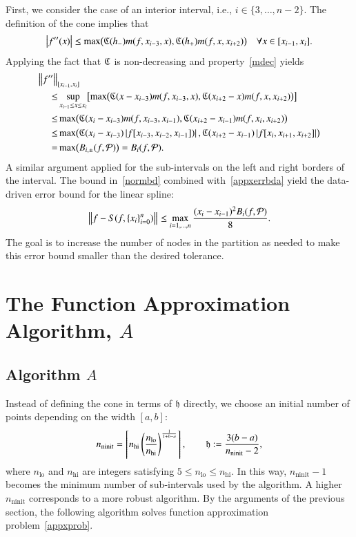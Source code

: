 \documentclass[review]{elsarticle}
\newcommand{\datasites}{\{x_i\}_{i=0}^n}
\theoremstyle{definition}
\DeclareMathOperator{\lo}{lo}
\DeclareMathOperator{\ninit}{ninit}
\begin{document}
First, we consider the case of an interior interval, i.e., $i \in \{3, \ldots, n-2\}$. The definition of the cone implies that
\begin{equation*}
\left \lvert f''(x) \right \rvert \le \max\bigl(\mathfrak{C}(h_-)m(f,x_{i-3},x),\mathfrak{C}(h_+)m(f,x,x_{i+2})\bigr)  \quad  \forall x \in [x_{i-1},x_i].
\end{equation*}
Applying the fact that $\mathfrak{C}$ is non-decreasing and property~\eqref{mdec} yields
\begin{align*}
\nonumber
\MoveEqLeft{\norm[{[x_{i-1},x_i]}]{f''}}\\
\nonumber
 \le  & \sup_{x_{i-1} \le x \le x_i} \bigl[\max\bigl(\fC(x-x_{i-3})m(f,x_{i-3},x),\fC(x_{i+2}-x)m(f,x,x_{i+2})\bigr)\bigr]  \\
\nonumber
 \le  &  \max\bigl(\fC(x_{i}-x_{i-3})m(f,x_{i-3},x_{i-1}),\fC(x_{i+2}-x_{i-1})m(f,x_i,x_{i+2})\bigr) \\
\nonumber  \le & \max\bigl(\fC(x_{i}-x_{i-3})\abs{f[x_{i-3},x_{i-2},x_{i-1}])},\bigr.
 \fC(x_{i+2}-x_{i-1})\abs{f[x_i,x_{i+1},x_{i+2}]}\bigr) \\
 =  & \max\bigl(B_{i,\pm}(f,\cp)\bigr) = B_i(f,\cp).
\end{align*}
A similar argument applied for the sub-intervals on the left and right borders of the interval.
The bound in~\eqref{normbd} combined with~\eqref{appxerrbda} yield the
data-driven error bound for the linear spline:
\begin{equation} \label{appxerrbdb}
\norm{f - S(f,\datasites)} \le
\max_{i=1, \ldots, n} \frac{(x_i - x_{i-1})^2 B_{i}(f,\cp)}{8} .
\end{equation}
The goal is to increase the number of nodes in the partition as needed to make
this error bound smaller than the desired tolerance.

\section{The Function Approximation Algorithm, $A$}\label{sec:fappx}


\subsection{Algorithm $A$} \label{subsec:appxalgo}
Instead of defining the cone in terms of $\mathfrak{h}$ directly, we choose an initial number of points depending on the width $[a,b]$:
\begin{equation}
\label{nodefinition}
n_{\ninit} = \left\lceil n_{\text{hi}}
\left(\frac{n_{\lo}}{n_{\text{hi}}}\right)^{\frac{1}{1+b-a}}\right\rceil, \qquad \fh := \frac{3(b-a)}{n_{\ninit}-2},
\end{equation}
where $n_{\lo}$ and $n_{\text{hi}}$ are integers satisfying $5 \le n_{\lo} \le n_{\text{hi}}$.  In this way, $n_{\ninit} -1$ becomes the minimum number of sub-intervals used by the algorithm.  A higher $n_{\ninit}$ corresponds to a more robust algorithm.  By the arguments of the previous section, the following algorithm solves function approximation problem~\eqref{appxprob}.
\end{document}
